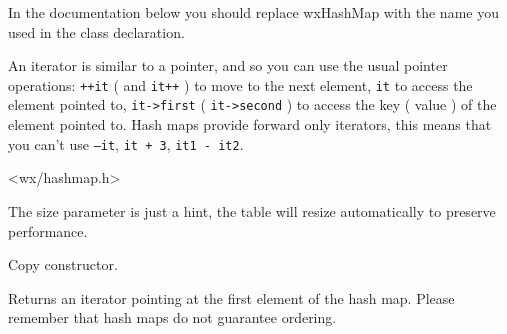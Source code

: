 
In the documentation below you should replace wxHashMap with the name
you used in the class declaration.

\begin{twocollist}
\end{twocollist}


An iterator is similar to a pointer, and so you can use the usual pointer
operations: {\tt ++it} ( and {\tt it++} ) to move to the next element,
{\tt *it} to access the element pointed to, {\tt it->first}
( {\tt it->second} ) to access the key ( value )
of the element pointed to. Hash maps provide forward only iterators, this
means that you can't use {\tt --it}, {\tt it + 3}, {\tt it1 - it2}.


<wx/hashmap.h>


\label{wxhashmapctor}


The size parameter is just a hint, the table will resize automatically
to preserve performance.


Copy constructor.

\label{wxhashmapbegin}



Returns an iterator pointing at the first element of the hash map.
Please remember that hash maps do not guarantee ordering.


